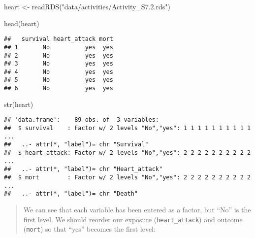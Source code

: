 \documentclass[
]{memoir}
\newenvironment{Shaded}{\begin{snugshade}}{\end{snugshade}}
\newcommand{\AttributeTok}[1]{\textcolor[rgb]{0.77,0.63,0.00}{#1}}
\newcommand{\FunctionTok}[1]{\textcolor[rgb]{0.00,0.00,0.00}{#1}}
\newcommand{\NormalTok}[1]{#1}
\newcommand{\OtherTok}[1]{\textcolor[rgb]{0.56,0.35,0.01}{#1}}
\newcommand{\SpecialCharTok}[1]{\textcolor[rgb]{0.00,0.00,0.00}{#1}}
\newcommand{\StringTok}[1]{\textcolor[rgb]{0.31,0.60,0.02}{#1}}
\begin{document}
\begin{Shaded}
\begin{Highlighting}[]
\NormalTok{heart }\OtherTok{\textless{}{-}} \FunctionTok{readRDS}\NormalTok{(}\StringTok{"data/activities/Activity\_S7.2.rds"}\NormalTok{)}

\FunctionTok{head}\NormalTok{(heart)}
\end{Highlighting}
\end{Shaded}

\begin{verbatim}
##   survival heart_attack mort
## 1       No          yes  yes
## 2       No          yes  yes
## 3       No          yes  yes
## 4       No          yes  yes
## 5       No          yes  yes
## 6       No          yes  yes
\end{verbatim}

\begin{Shaded}
\begin{Highlighting}[]
\FunctionTok{str}\NormalTok{(heart)}
\end{Highlighting}
\end{Shaded}

\begin{verbatim}
## 'data.frame':    89 obs. of  3 variables:
##  $ survival    : Factor w/ 2 levels "No","yes": 1 1 1 1 1 1 1 1 1 1 ...
##   ..- attr(*, "label")= chr "Survival"
##  $ heart_attack: Factor w/ 2 levels "No","yes": 2 2 2 2 2 2 2 2 2 2 ...
##   ..- attr(*, "label")= chr "Heart_attack"
##  $ mort        : Factor w/ 2 levels "No","yes": 2 2 2 2 2 2 2 2 2 2 ...
##   ..- attr(*, "label")= chr "Death"
\end{verbatim}

\begin{quote}
We can see that each variable has been entered as a factor, but ``No'' is the first level. We should reorder our exposure (\texttt{heart\_attack}) and outcome (\texttt{mort}) so that ``yes'' becomes the first level:
\end{quote}

\begin{Shaded}
\end{Shaded}
\end{document}

